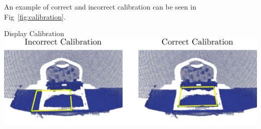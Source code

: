 An example of correct and incorrect calibration can be seen in Fig~\ref{fig:calibration}.

\begin{figureBox}[label={fig:calibration}, width=0.8\linewidth]{Display Calibration}
    \includegraphics[width=1.0\linewidth]{./implementation/figures/calibration.pdf}
\end{figureBox}

